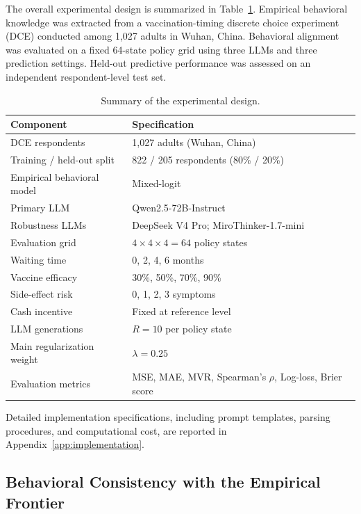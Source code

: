 \documentclass[11pt]{article}
\begin{document}
The overall experimental design is summarized in Table~\ref{tab:exp_setup}. Empirical behavioral knowledge was extracted from a vaccination-timing discrete choice experiment (DCE) conducted among 1,027 adults in Wuhan, China. Behavioral alignment was evaluated on a fixed 64-state policy grid using three LLMs and three prediction settings. Held-out predictive performance was assessed on an independent respondent-level test set.

\begin{table}[t]
\centering
\caption{Summary of the experimental design.}
\label{tab:exp_setup}
\begin{tabular}{ll}
\toprule
Component & Specification\\
\midrule
DCE respondents & 1,027 adults (Wuhan, China)\\
Training / held-out split & 822 / 205 respondents (80\% / 20\%)\\
Empirical behavioral model & Mixed-logit\\
Primary LLM & Qwen2.5-72B-Instruct\\
Robustness LLMs & DeepSeek V4 Pro; MiroThinker-1.7-mini\\
Evaluation grid & $4\times4\times4=64$ policy states\\
Waiting time & 0, 2, 4, 6 months\\
Vaccine efficacy & 30\%, 50\%, 70\%, 90\%\\
Side-effect risk & 0, 1, 2, 3 symptoms\\
Cash incentive & Fixed at reference level\\
LLM generations & $R=10$ per policy state\\
Main regularization weight & $\lambda=0.25$\\
Evaluation metrics & MSE, MAE, MVR, Spearman's $\rho$, Log-loss, Brier score\\
\bottomrule
\end{tabular}
\end{table}

Detailed implementation specifications, including prompt templates, parsing procedures, and computational cost, are reported in Appendix~\ref{app:implementation}.

\clearpage
\subsection{Behavioral Consistency with the Empirical Frontier}
\label{sec:behavioral_consistency}
\end{document}
